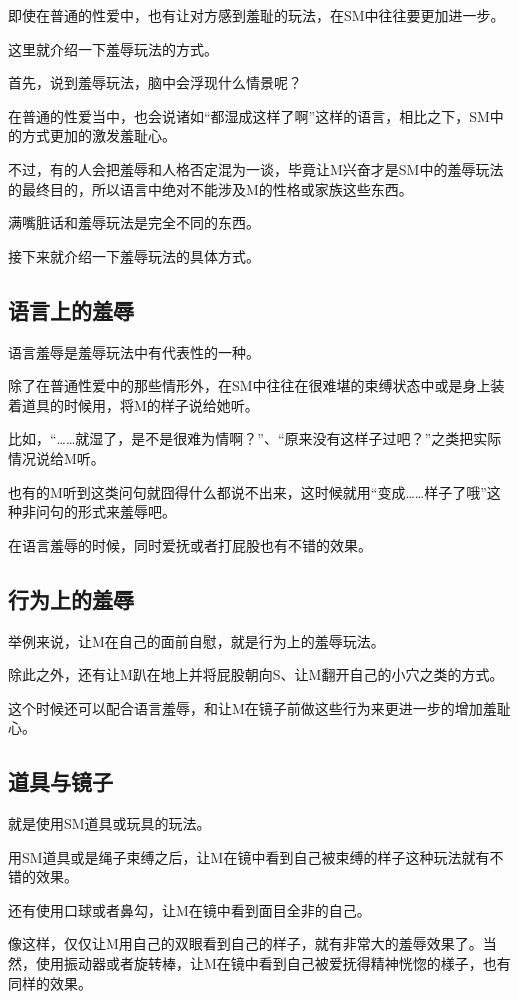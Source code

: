 \documentclass[12pt,UTF8]{ctexbook}
\begin{document}
即使在普通的性爱中，也有让对方感到羞耻的玩法，在SM中往往要更加进一步。

这里就介绍一下羞辱玩法的方式。

首先，说到羞辱玩法，脑中会浮现什么情景呢？

在普通的性爱当中，也会说诸如“都湿成这样了啊”这样的语言，相比之下，SM中的方式更加的激发羞耻心。

不过，有的人会把羞辱和人格否定混为一谈，毕竟让M兴奋才是SM中的羞辱玩法的最终目的，所以语言中绝对不能涉及M的性格或家族这些东西。

满嘴脏话和羞辱玩法是完全不同的东西。

接下来就介绍一下羞辱玩法的具体方式。 

\subsection{语言上的羞辱}

语言羞辱是羞辱玩法中有代表性的一种。

除了在普通性爱中的那些情形外，在SM中往往在很难堪的束缚状态中或是身上装着道具的时候用，将M的样子说给她听。

比如，“……就湿了，是不是很难为情啊？”、“原来没有这样子过吧？”之类把实际情况说给M听。

也有的M听到这类问句就囧得什么都说不出来，这时候就用“变成……样子了哦”这种非问句的形式来羞辱吧。

在语言羞辱的时候，同时爱抚或者打屁股也有不错的效果。 

\subsection{行为上的羞辱}

举例来说，让M在自己的面前自慰，就是行为上的羞辱玩法。

除此之外，还有让M趴在地上并将屁股朝向S、让M翻开自己的小穴之类的方式。

这个时候还可以配合语言羞辱，和让M在镜子前做这些行为来更进一步的增加羞耻心。 

\subsection{道具与镜子}

就是使用SM道具或玩具的玩法。

用SM道具或是绳子束缚之后，让M在镜中看到自己被束缚的样子这种玩法就有不错的效果。

还有使用口球或者鼻勾，让M在镜中看到面目全非的自己。

像这样，仅仅让M用自己的双眼看到自己的样子，就有非常大的羞辱效果了。当然，使用振动器或者旋转棒，让M在镜中看到自己被爱抚得精神恍惚的様子，也有同样的效果。
\end{document}
